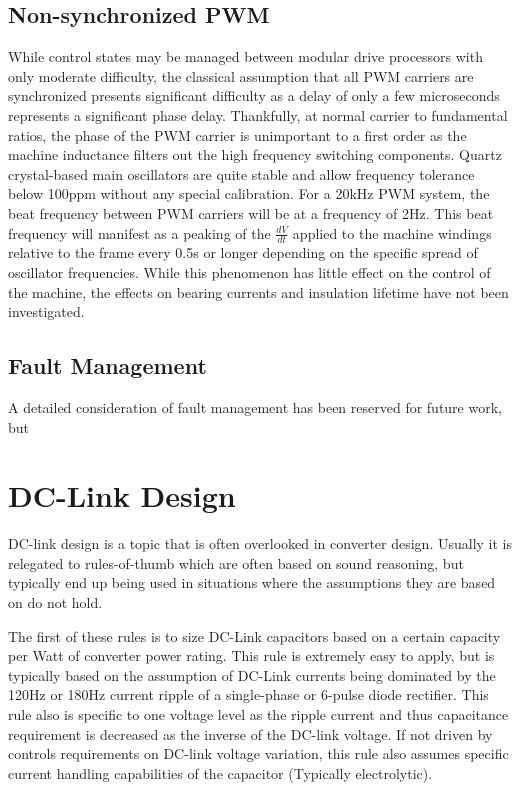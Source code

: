 \subsection{Non-synchronized PWM}
While control states may be managed between modular drive processors with only
moderate difficulty, the classical assumption that all PWM carriers are
synchronized presents significant difficulty as a delay of only a few
microseconds represents a significant phase delay.
Thankfully, at normal carrier to fundamental ratios, the phase of the PWM
carrier is unimportant to a first order as the machine inductance filters out
the high frequency switching components.
Quartz crystal-based main oscillators are quite stable and allow frequency
tolerance below 100ppm without any special calibration.
For a 20kHz PWM system, the beat frequency between PWM carriers will be at a
frequency of 2Hz.
This beat frequency will manifest as a peaking of the $\frac{dV}{dt}$ applied
to the machine windings relative to the frame every 0.5s or longer depending
on the specific spread of oscillator frequencies.
While this phenomenon has little effect on the control of the machine, the
effects on bearing currents and insulation lifetime have not been investigated.

\subsection{Fault Management}
A detailed consideration of fault management has been reserved for future work, but 

\section{DC-Link Design}
DC-link design is a topic that is often overlooked in converter design.
Usually it is relegated to rules-of-thumb which are often based on sound
reasoning, but typically end up being used in situations where the assumptions
they are based on do not hold.

The first of these rules is to size DC-Link capacitors based on a certain
capacity per Watt of converter power rating.
This rule is extremely easy to apply, but is typically based on the assumption
of DC-Link currents being dominated by the 120Hz or 180Hz current ripple of a
single-phase or 6-pulse diode rectifier.
This rule also is specific to one voltage level as the ripple current and thus
capacitance requirement is decreased as the inverse of the DC-link voltage.
If not driven by controls requirements on DC-link voltage variation, this rule
also assumes specific current handling capabilities of the capacitor
(Typically electrolytic).

